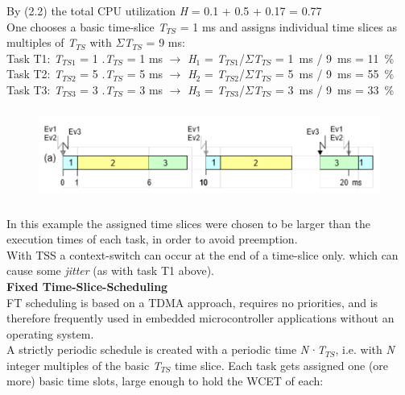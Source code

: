 By (2.2) the total CPU utilization \textit{H} = 0.1 + 0.5 + 0.17 = 0.77 \\

One chooses a basic time-slice \textit{T}${}_{TS}$ = 1 ms and assigns individual time slices as multiples of \textit{T}${}_{TS}$ with $\Sigma$\textit{T}${}_{TS}$ = 9 ms:\\

Task T1:    \textit{T}${}_{TS1}$ = 1 $.$\textit{T}${}_{TS}$ = 1 ms $\rightarrow$ \textit{H}${}_{1}$ = \textit{T}${}_{TS1}$/$\Sigma$\textit{T}${}_{TS}$ = 1~ms / 9~ms = 11~\%\\
Task T2:    \textit{T}${}_{TS2}$ = 5 $.$\textit{T}${}_{TS}$ = 5 ms $\rightarrow$ \textit{H}${}_{2}$ = \textit{T}${}_{TS2}$/$\Sigma$\textit{T}${}_{TS}$ = 5~ms / 9~ms = 55~\%\\
Task T3:     \textit{T}${}_{TS3}$ = 3 $.$\textit{T}${}_{TS}$ = 3 ms $\rightarrow$ \textit{H}${}_{3}$ = \textit{T}${}_{TS3}$/$\Sigma$\textit{T}${}_{TS}$ = 3~ms / 9~ms = 33~\%

	\begin{figure}[h]
    \centering
    \includegraphics[width=13cm, height=3cm]{Images/image91.png}
    \label{fig:Fig 36}
    \end{figure}

In this example the assigned time slices were chosen to be larger than the execution times of each task, in order to avoid preemption.\\

With TSS a context-switch can occur at the end of a time-slice only. which can cause some \textit{jitter} (as with task T1 above).\\

{\rot\bf Fixed Time-Slice-Scheduling }\\

FT scheduling is based on a TDMA approach, requires no priorities, and is therefore frequently used in embedded microcontroller applications without an operating system.\\

A strictly periodic schedule is created with a periodic time \textit{N·T${}_{TS}$}, i.e. with \textit{N} integer multiples of the basic \textit{T${}_{TS}$} time slice. Each task gets assigned one (ore more) basic time slots, large enough to hold the WCET of each:\\

